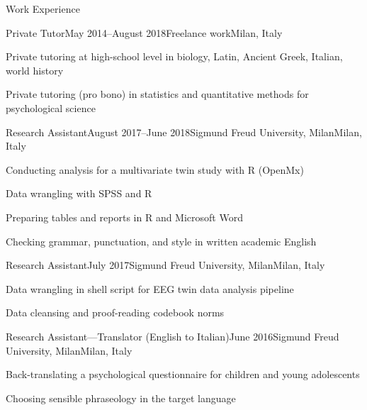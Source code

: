 \documentclass{resume2} %
\begin{document}
\begin{rSection}{Work Experience}




\begin{rSubsection}{Private Tutor}{May 2014--August 2018}{Freelance work}{Milan, Italy}
\item Private tutoring at high-school level in biology, Latin, Ancient Greek, Italian, world history
\item Private tutoring (pro bono) in statistics and quantitative methods for psychological science
\end{rSubsection}


\begin{rSubsection}{Research Assistant}{August 2017--June 2018}{Sigmund Freud University, Milan}{Milan, Italy}
\item Conducting analysis for a multivariate twin study with R (OpenMx)
\item Data wrangling with SPSS and R%
\item Preparing tables and reports in R and Microsoft Word
\item Checking grammar, punctuation, and style in written academic English
\end{rSubsection}

\begin{rSubsection}{Research Assistant}{July 2017}{Sigmund Freud University, Milan}{Milan, Italy}
\item Data wrangling in shell script for EEG twin data analysis pipeline
\item Data cleansing and proof-reading codebook norms
\end{rSubsection}

\begin{rSubsection}{Research Assistant---Translator (English to Italian)}{June 2016}{Sigmund Freud University, Milan}{Milan, Italy}
\item Back-translating a psychological questionnaire for children and young adolescents
\item Choosing sensible phraseology in the target language
\end{rSubsection}



\end{rSection}
\end{document}
